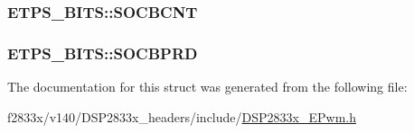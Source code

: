 \subsubsection[{S\+O\+C\+B\+C\+N\+T}]{ E\+T\+P\+S\+\_\+\+B\+I\+T\+S\+::\+S\+O\+C\+B\+C\+N\+T}\label{struct_e_t_p_s___b_i_t_s_a58e50ab18d578b332587f16acf765d81}
\hypertarget{struct_e_t_p_s___b_i_t_s_aae6da719ccf98a207a587d44a0ec19a5}{}
\subsubsection[{S\+O\+C\+B\+P\+R\+D}]{ E\+T\+P\+S\+\_\+\+B\+I\+T\+S\+::\+S\+O\+C\+B\+P\+R\+D}\label{struct_e_t_p_s___b_i_t_s_aae6da719ccf98a207a587d44a0ec19a5}


The documentation for this struct was generated from the following file\+:\begin{DoxyCompactItemize}
\item 
f2833x/v140/\+D\+S\+P2833x\+\_\+headers/include/\hyperlink{_d_s_p2833x___e_pwm_8h}{D\+S\+P2833x\+\_\+\+E\+Pwm.\+h}\end{DoxyCompactItemize}
